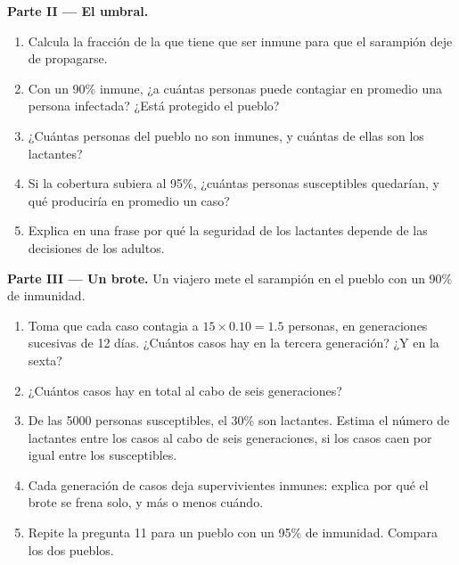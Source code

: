 \begin{problem}
\medskip
\noindent\textbf{Parte II --- El umbral.}
\begin{enumerate}[resume]
  \item Calcula la fracción de la  que tiene que ser inmune
        para que el sarampión deje de propagarse.
  \item Con un 90\% inmune, ¿a cuántas personas puede contagiar en
        promedio una persona infectada? ¿Está protegido el pueblo?
  \item ¿Cuántas personas del pueblo no son inmunes, y cuántas de ellas
        son los lactantes?
  \item Si la cobertura subiera al 95\%, ¿cuántas personas susceptibles
        quedarían, y qué produciría en promedio un caso?
  \item Explica en una frase por qué la seguridad de los lactantes
        depende de las decisiones de los adultos.
\end{enumerate}

\medskip
\noindent\textbf{Parte III --- Un brote.}
Un viajero mete el sarampión en el pueblo con un 90\% de inmunidad.
\begin{enumerate}[resume]
  \item Toma que cada caso contagia a $15 \times 0.10 = 1.5$ personas,
        en generaciones sucesivas de 12 días. ¿Cuántos casos hay en la
        tercera generación? ¿Y en la sexta?
  \item ¿Cuántos casos hay en total al cabo de seis generaciones?
  \item De las 5000 personas susceptibles, el 30\% son lactantes.
        Estima el número de lactantes entre los casos al cabo de seis
        generaciones, si los casos caen por igual entre los
        susceptibles.
  \item Cada generación de casos deja supervivientes inmunes: explica
        por qué el brote se frena solo, y más o menos cuándo.
  \item Repite la pregunta 11 para un pueblo con un 95\% de inmunidad.
        Compara los dos pueblos.
\end{enumerate}


\end{problem}
